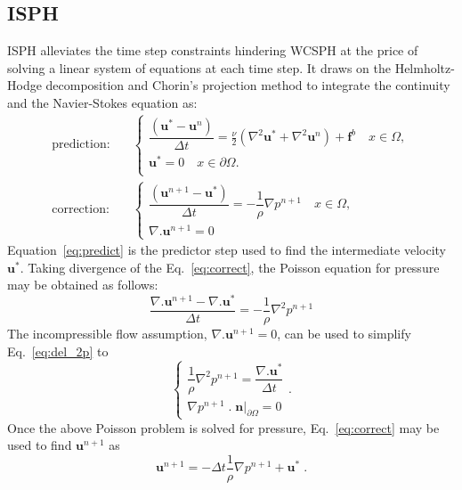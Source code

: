 \subsection{ISPH}
\label{sec:ISPH}
ISPH alleviates the time step constraints hindering WCSPH at the price of solving a linear system of equations at each time step. It draws on the Helmholtz-Hodge decomposition and Chorin's projection method \cite{chorin1968numerical} to integrate the continuity and the Navier-Stokes equation as:
\begin{align}
\text{prediction:} \quad &\begin{cases}\label{eq:predict} 
\dfrac{(\mathbf{u}^*-\mathbf{u}^n)}{\Delta t}=\frac{\nu}{2}(\nabla^2\mathbf{u}^* +\nabla^2\mathbf{u}^n) + \mathbf{f}^b\quad x\in \Omega,\\
\mathbf{u}^*=0 \quad x\in \partial\Omega.\\
\end{cases}  \\
\text{correction:} \quad &\begin{cases}\label{eq:correct} 
\dfrac{(\mathbf{u}^{n+1}-\mathbf{u}^*)}{\Delta t}=-\dfrac{1}{\rho} \nabla p^{n+1}\quad x\in \Omega, \\
\nabla.\mathbf{u}^{n+1}=0
\end{cases}  
\end{align}
Equation~\ref{eq:predict} is the predictor step used to find the intermediate velocity $\mathbf{u}^*$. Taking divergence of the Eq.~\ref{eq:correct}, the Poisson equation for pressure may be obtained as follows: 
\begin{equation}\label{eq:del_2p}
\dfrac{\nabla.\mathbf{u}^{n+1}-\nabla.\mathbf{u}^*}{\Delta t}=-\dfrac{1}{\rho} \nabla^2 p^{n+1}
\end{equation}
The incompressible flow assumption, $\nabla . \mathbf{u}^{n+1} =0$, can be used to simplify Eq.~\ref{eq:del_2p} to 
\begin{equation}\label{eq:pressure}
\begin{cases}
\dfrac{1}{\rho} \nabla^2 p^{n+1}=\dfrac{\nabla.\mathbf{u}^*}{\Delta t}\\
\nabla p^{n+1}\;.\;\mathbf{n}|_{\partial \Omega}=0
\end{cases} .
\end{equation}
Once the above Poisson problem is solved for pressure, Eq.~\ref{eq:correct} may be used to find $\mathbf{u}^{n+1}$ as
\begin{equation*}
\mathbf{u}^{n+1}=-{\Delta t}\dfrac{1}{\rho} \nabla p^{n+1}+\mathbf{u}^* \;.
\end{equation*}
